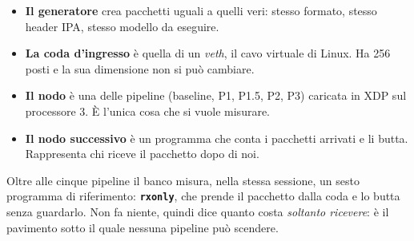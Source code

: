 \documentclass[11pt,a4paper,oneside]{report}
\begin{document}
\begin{center}
\end{center}

\begin{itemize}
  \item \textbf{Il generatore} crea pacchetti uguali a quelli veri: stesso formato,
        stesso header IPA, stesso modello da eseguire.
  \item \textbf{La coda d'ingresso} è quella di un \emph{veth}, il cavo virtuale di
        Linux. Ha 256 posti e la sua dimensione non si può cambiare.
  \item \textbf{Il nodo} è una delle pipeline (baseline, P1, P1.5, P2, P3) caricata
        in XDP sul processore 3. È l'unica cosa che si vuole misurare.
  \item \textbf{Il nodo successivo} è un programma che conta i pacchetti arrivati e
        li butta. Rappresenta chi riceve il pacchetto dopo di noi.
\end{itemize}

Oltre alle cinque pipeline il banco misura, nella stessa sessione, un sesto
programma di riferimento: \textbf{\texttt{rxonly}}, che prende il pacchetto dalla
coda e lo butta senza guardarlo. Non fa niente, quindi dice quanto costa
\emph{soltanto ricevere}: è il pavimento sotto il quale nessuna pipeline può
scendere.
\end{document}
